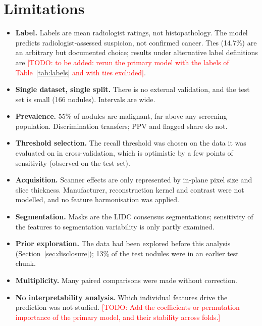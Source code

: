 \documentclass[journal]{IEEEtran}
\newcommand{\TODO}[1]{\textcolor{red}{[TODO: #1]}}
\begin{document}
\section{Limitations}
\label{sec:limits}
\begin{itemize}
  \item \textbf{Label.} Labels are mean radiologist ratings, not histopathology. The model predicts radiologist-assessed
        suspicion, not confirmed cancer. Ties (14.7\%) are an arbitrary but documented choice; results under alternative
        label definitions are \TODO{to be added: rerun the primary model with the labels of Table~\ref{tab:labels} and with ties excluded}.
  \item \textbf{Single dataset, single split.} There is no external validation, and the test set is small (166 nodules). Intervals
        are wide.
  \item \textbf{Prevalence.} 55\% of nodules are malignant, far above any screening population. Discrimination transfers; PPV and
        flagged share do not.
  \item \textbf{Threshold selection.} The recall threshold was chosen on the data it was evaluated on in cross-validation, which
        is optimistic by a few points of sensitivity (observed on the test set).
  \item \textbf{Acquisition.} Scanner effects are only represented by in-plane pixel size and slice thickness. Manufacturer,
        reconstruction kernel and contrast were not modelled, and no feature harmonisation was applied.
  \item \textbf{Segmentation.} Masks are the LIDC consensus segmentations; sensitivity of the features to segmentation variability
        is only partly examined.
  \item \textbf{Prior exploration.} The data had been explored before this analysis (Section~\ref{sec:disclosure}); 13\% of the test nodules were in an earlier test chunk.
  \item \textbf{Multiplicity.} Many paired comparisons were made without correction.
  \item \textbf{No interpretability analysis.} Which individual features drive the prediction was not studied.
        \TODO{Add the coefficients or permutation importance of the primary model, and their stability across folds.}
\end{itemize}

\end{document}
